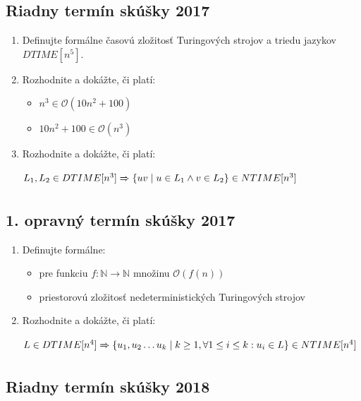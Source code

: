 \documentclass[11pt,a4paper]{article}
\begin{document}
		\subsection{Riadny termín skúšky 2017}

		\begin{enumerate}
			\item Definujte formálne časovú zložitosť Turingových strojov a triedu jazykov $DTIME[n^5]$.

			\item Rozhodnite a dokážte, či platí:
	
			\begin{itemize}
				\item $n^3 \in \mathcal{O}(10n^2 + 100)$
				\item $10n^2 + 100 \in \mathcal{O}(n^3)$
			\end{itemize}
	
			\item Rozhodnite a dokážte, či platí:
	
			$L_1, L_2 \in DTIME[n^3] \xRightarrow[]{} \{ uv \mid u \in  L_1 \land v \in L_2\} \in NTIME[n^3]$
		\end{enumerate}	

		\subsection{1. opravný termín skúšky 2017}

		\begin{enumerate}
			\item Definujte formálne:

			\begin{itemize}
				\item pre funkciu $f: \mathbb{N} \rightarrow \mathbb{N}$ množinu $\mathcal{O}(f(n))$
				\item priestorovú zložitosť nedeterministických Turingových strojov
			\end{itemize}

			\item Rozhodnite a dokážte, či platí:
	
			$L \in DTIME[n^4] \xRightarrow[]{} \{ u_1, u_2 \ldots u_k \mid k \geq 1, \forall 1 \leq i \leq k: u_i \in L\} \in NTIME[n^4]$
		\end{enumerate}	

		\subsection{Riadny termín skúšky 2018}
\end{document}
